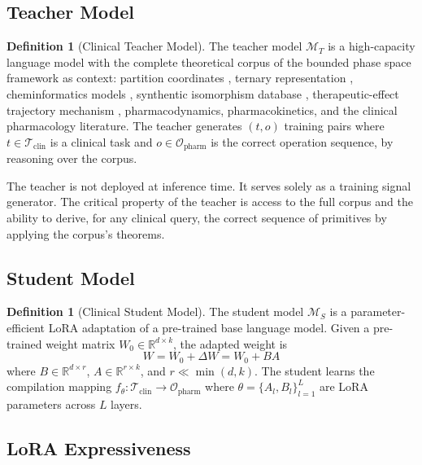 \documentclass[11pt,twocolumn,a4paper]{article}
\theoremstyle{definition}
\newtheorem{definition}[theorem]{Definition}
\theoremstyle{remark}
\newcommand{\R}{\mathbb{R}}
\newcommand{\model}{\mathcal{M}}
\newcommand{\params}{\theta}
\newcommand{\taskspace}{\mathcal{T}}
\newcommand{\opspace}{\mathcal{O}}
\begin{document}
\subsection{Teacher Model}

\begin{definition}[Clinical Teacher Model]
\label{def:teacher}
The teacher model $\model_T$ is a high-capacity language model with the complete theoretical corpus of the bounded phase space framework as context: partition coordinates \citep{sachikonye2025a}, ternary representation \citep{sachikonye2025c}, cheminformatics models \citep{sachikonye2025d}, synthentic isomorphism database \citep{sachikonye2025e}, therapeutic-effect trajectory mechanism \citep{sachikonye2025f}, pharmacodynamics, pharmacokinetics, and the clinical pharmacology literature. The teacher generates $(t, o)$ training pairs where $t \in \taskspace_{\mathrm{clin}}$ is a clinical task and $o \in \opspace_{\mathrm{pharm}}$ is the correct operation sequence, by reasoning over the corpus.
\end{definition}

The teacher is not deployed at inference time. It serves solely as a training signal generator. The critical property of the teacher is access to the full corpus and the ability to derive, for any clinical query, the correct sequence of primitives by applying the corpus's theorems.

\subsection{Student Model}

\begin{definition}[Clinical Student Model]
\label{def:student}
The student model $\model_S$ is a parameter-efficient LoRA adaptation \citep{hu2022} of a pre-trained base language model. Given a pre-trained weight matrix $W_0 \in \R^{d \times k}$, the adapted weight is
\begin{equation}
W = W_0 + \Delta W = W_0 + BA
\end{equation}
where $B \in \R^{d \times r}$, $A \in \R^{r \times k}$, and $r \ll \min(d, k)$. The student learns the compilation mapping $f_\params: \taskspace_{\mathrm{clin}} \to \opspace_{\mathrm{pharm}}$ where $\params = \{A_l, B_l\}_{l=1}^{L}$ are LoRA parameters across $L$ layers.
\end{definition}

\subsection{LoRA Expressiveness}
\label{sec:lora_expressiveness}
\end{document}
